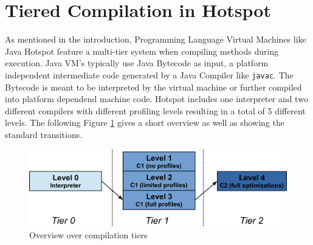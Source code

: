 \section{Tiered Compilation in Hotspot}
\label{sec:tiered}
As mentioned in the introduction, Programming Language Virtual Machines like Java Hotspot feature a multi-tier system when compiling methods during execution. 
Java VM's typically use Java Bytecode as input, a platform independent intermediate code generated by a Java Compiler like \texttt{javac}.
The Bytecode is meant to be interpreted by the virtual machine or further compiled into platform dependend machine code.
Hotspot includes one interpreter and two different compilers with different profiling levels resulting in a total of 5 different levels. The following Figure \ref{f:hs_tiers} gives a short overview as well as showing the standard transitions.
\begin{figure}[h]
  \begin{center}
    \centering
    \includegraphics{figures/hs_tiers.png}
    \caption{Overview over compilation tiers}
    \label{f:hs_tiers}
  \end{center}
\end{figure}

